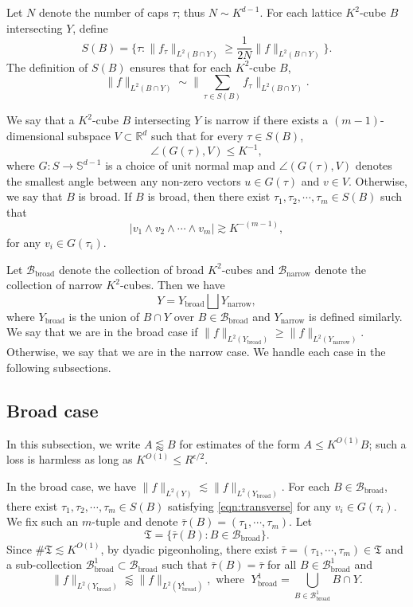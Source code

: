 \documentclass[11pt]{amsart}
\theoremstyle{definition}
\theoremstyle{remark}
\numberwithin{equation}{section}
\renewcommand{\S}{\mathbb{S}}
\newcommand{\R}{\mathbb{R}}
\newcommand{\Bb}{\mathcal{B}_{\operatorname{broad}}}
\newcommand{\Bn}{\mathcal{B}_{\operatorname{narrow}}}
\newcommand{\Yb}{Y_{\operatorname{broad}}}
\newcommand{\Yn}{Y_{\operatorname{narrow}}}
\newcommand{\les}{\lesssim}
\newcommand{\ges}{\gtrsim}
\newcommand{\less}{\lessapprox}
\newcommand{\eps}{\epsilon}
\begin{document}
Let $N$ denote the number of caps $\tau$; thus $N \sim K^{d-1}$.  For each lattice $K^2$-cube $B$ intersecting $Y$, define 
\[ S(B) = \{ \tau :  \| f_\tau \|_{L^2(B\cap Y)} \geq \frac{1}{ 2 N } \| f\|_{L^2(B\cap Y)} \}.  \]
The definition of $S(B)$ ensures that for each $K^2$-cube $B$,
\[ \| f\|_{L^2(B\cap Y)} \sim \| \sum_{\tau\in S(B)} f_\tau \|_{L^2(B\cap Y)}. \]

We say that a $K^2$-cube $B$  intersecting $Y$ is narrow if there exists a $(m-1)$-dimensional subspace $V\subset \R^d$ such that for every $\tau\in S(B)$, 
\[ \angle(G(\tau),V) \leq K^{-1},\]
where $G: S \to \S^{d-1}$ is a choice of unit normal map and $\angle(G(\tau),V)$ denotes the smallest angle between any non-zero vectors $u\in G(\tau)$ and $v\in V$. Otherwise, we say that $B$ is broad. If $B$ is broad, then there exist $\tau_1,\tau_2,\cdots,\tau_m \in S(B)$ such that
\begin{equation}\label{eqn:transverse}
	|v_1\wedge v_2\wedge\cdots\wedge v_m| \ges K^{-(m-1)},
\end{equation}
for any $v_i \in G(\tau_i)$.

Let $\Bb$ denote the collection of broad $K^2$-cubes and $\Bn$ denote the collection of narrow $K^2$-cubes. Then we have 
\[ Y= \Yb \bigsqcup \Yn, \]
where $\Yb$ is the union of $B\cap Y$ over $B\in \Bb$ and $\Yn$ is defined similarly. We say that we are in the broad case if $\| f\|_{L^2(\Yb)} \geq \| f\|_{L^2(\Yn)}$. Otherwise, we  say that we are in the narrow case. We handle each case in the following subsections.

\subsection{Broad case}
In this subsection, 
we write $A \less B$ for estimates of the form $A \leq K^{O(1)}B$; such a loss is harmless as long as $K^{O(1)} \leq R^{\eps/2}$.

In the broad case,  we have $\| f\|_{L^2(Y)} \les \| f\|_{L^2(\Yb)}$.  
For each $B\in \Bb$, there exist $\tau_1,\tau_2,\cdots,\tau_m \in S(B)$ satisfying \eqref{eqn:transverse} for any $v_i \in G(\tau_i)$. We fix such an $m$-tuple and denote $\bar{\tau}(B) = (\tau_1,\cdots,\tau_m)$. Let 
\[ \mathfrak T = \{ \bar{\tau}(B) : B \in \Bb \}. \]
Since $\# \mathfrak T \les K^{O(1)}$, by dyadic pigeonholing, there exist $\bar{\tau}=(\tau_1,\cdots,\tau_m) \in \mathfrak T$ and a sub-collection  $\Bb^1 \subset \Bb$ such that $\bar{\tau}(B) = \bar{\tau}$ for all $B\in \Bb^1$ and 
\[   \| f\|_{L^2(\Yb)}\less  \| f\|_{L^2(\Yb^1)}, \text{ where } \; \Yb^1 = \bigcup_{B\in \Bb^1} B\cap Y. \]
\end{document}
